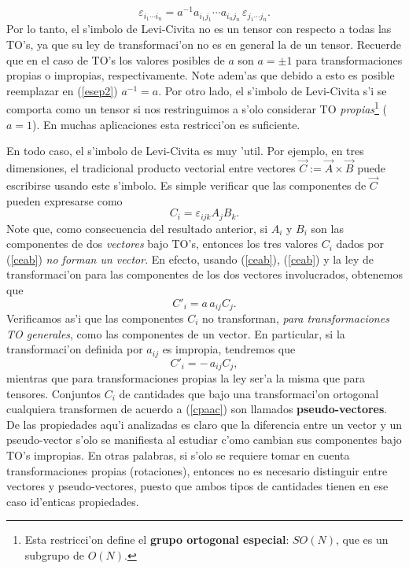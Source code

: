 \begin{equation}\label{esep2}
\boxed{\varepsilon_{i_1\cdots i_n} =a^{-1}a_{i_1j_1}\cdots a_{i_nj_n}\,\varepsilon_{j_1\cdots j_n}.}
\end{equation}
Por lo tanto, el s'imbolo de Levi-Civita no es un tensor con respecto a todas las TO's, ya que su ley de transformaci'on no es en general la de un tensor. Recuerde que en el caso de TO's los valores posibles de $a$ son $a=\pm 1$ para transformaciones propias o impropias, respectivamente. Note adem'as que debido a esto es posible reemplazar en (\ref{esep2}) $a^{-1}=a$. Por otro lado, el s'imbolo de Levi-Civita s'i se comporta como un tensor si nos restringuimos a s'olo considerar TO \textit{propias}\footnote{Esta restricci'on define el \textbf{grupo ortogonal especial}: $SO(N)$, que es un subgrupo de $O(N)$.} ($a=1$). En muchas aplicaciones esta restricci'on es suficiente.

En todo caso, el s'imbolo de Levi-Civita es muy 'util. Por ejemplo, en tres dimensiones, el tradicional producto vectorial entre vectores $\vec{C}:=\vec{A}\times\vec{B}$ puede escribirse usando este s'imbolo. Es simple verificar que las componentes de $\vec{C}$ pueden expresarse como
\begin{equation}\label{ceab}
C_i=\varepsilon_{ijk}A_jB_k.
\end{equation}
Note que, como consecuencia del resultado anterior, si $A_i$ y $B_i$ son las componentes de dos \textit{vectores} bajo TO's, entonces los tres valores $C_i$ dados por (\ref{ceab}) \textit{no forman un vector}. En efecto, usando (\ref{ceab}), (\ref{ceab}) y la ley de transformaci'on para las componentes de los dos vectores involucrados, obtenemos que
\begin{equation}\label{cpaac}
C'_i=a\,a_{ij}C_j.
\end{equation}
Verificamos as'i que las componentes $C_i$ no transforman, \textit{para transformaciones TO generales}, como las componentes de un vector. En particular, si la transformaci'on definida por $a_{ij}$ es impropia, tendremos que
\begin{equation}\label{cpaac2}
C'_i=-\,a_{ij}C_j,
\end{equation}
mientras que para transformaciones propias la ley ser'a la misma que para tensores. Conjuntos $C_i$ de cantidades que bajo una transformaci'on ortogonal cualquiera transformen de acuerdo a (\ref{cpaac}) son llamados \textbf{pseudo-vectores}. De las propiedades aqu'i analizadas es claro que la diferencia entre un vector y un pseudo-vector s'olo se manifiesta al estudiar c'omo cambian sus componentes bajo TO's impropias. En otras palabras, si s'olo se requiere tomar en cuenta transformaciones propias (rotaciones), entonces no es necesario distinguir entre vectores y pseudo-vectores, puesto que ambos tipos de cantidades tienen en ese caso id'enticas propiedades.

